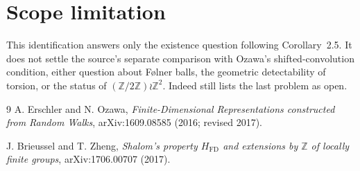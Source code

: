 \documentclass[11pt]{article}
\begin{document}
\section*{Scope limitation}

This identification answers only the existence question following
Corollary~2.5.  It does not settle the source's separate comparison with
Ozawa's shifted-convolution condition, either question about F\o lner balls,
the geometric detectability of torsion, or the status of
$(\mathbb Z/2\mathbb Z)\wr\mathbb Z^2$.  Indeed \cite{BZ} still lists the last
problem as open.

\begin{thebibliography}{9}
A. Erschler and N. Ozawa,
\emph{Finite-Dimensional Representations constructed from Random Walks},
arXiv:1609.08585 (2016; revised 2017).

J. Brieussel and T. Zheng,
\emph{Shalom's property $H_{\mathrm{FD}}$ and extensions by $\mathbb Z$ of
locally finite groups}, arXiv:1706.00707 (2017).
\end{thebibliography}
\end{document}

